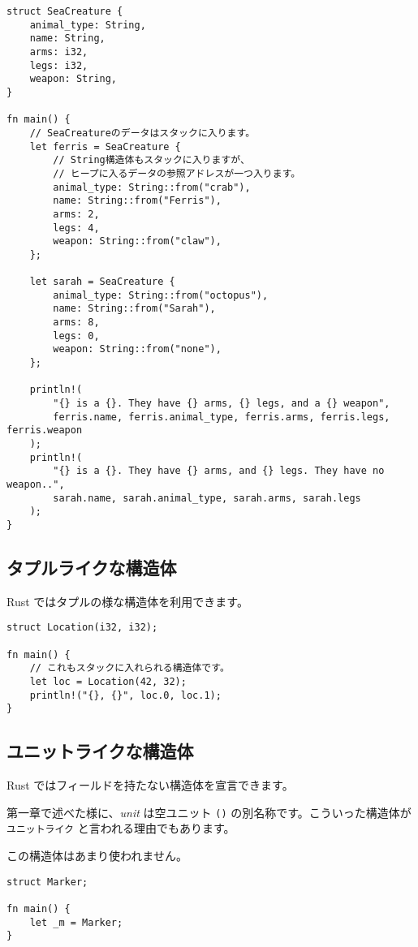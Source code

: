 \begin{verbatim}
struct SeaCreature {
    animal_type: String,
    name: String,
    arms: i32,
    legs: i32,
    weapon: String,
}

fn main() {
    // SeaCreatureのデータはスタックに入ります。
    let ferris = SeaCreature {
        // String構造体もスタックに入りますが、
        // ヒープに入るデータの参照アドレスが一つ入ります。
        animal_type: String::from("crab"),
        name: String::from("Ferris"),
        arms: 2,
        legs: 4,
        weapon: String::from("claw"),
    };

    let sarah = SeaCreature {
        animal_type: String::from("octopus"),
        name: String::from("Sarah"),
        arms: 8,
        legs: 0,
        weapon: String::from("none"),
    };

    println!(
        "{} is a {}. They have {} arms, {} legs, and a {} weapon",
        ferris.name, ferris.animal_type, ferris.arms, ferris.legs, ferris.weapon
    );
    println!(
        "{} is a {}. They have {} arms, and {} legs. They have no weapon..",
        sarah.name, sarah.animal_type, sarah.arms, sarah.legs
    );
}
\end{verbatim}

\subsection{タプルライクな構造体}

Rust ではタプルの様な構造体を利用できます。

\begin{verbatim}
struct Location(i32, i32);

fn main() {
    // これもスタックに入れられる構造体です。
    let loc = Location(42, 32);
    println!("{}, {}", loc.0, loc.1);
}
\end{verbatim}

\subsection{ユニットライクな構造体}

Rust ではフィールドを持たない構造体を宣言できます。

第一章で述べた様に、\emph{unit} は空ユニット \texttt{()}
の別名称です。こういった構造体が \texttt{ユニットライク}
と言われる理由でもあります。

この構造体はあまり使われません。

\begin{verbatim}
struct Marker;

fn main() {
    let _m = Marker;
}
\end{verbatim}

